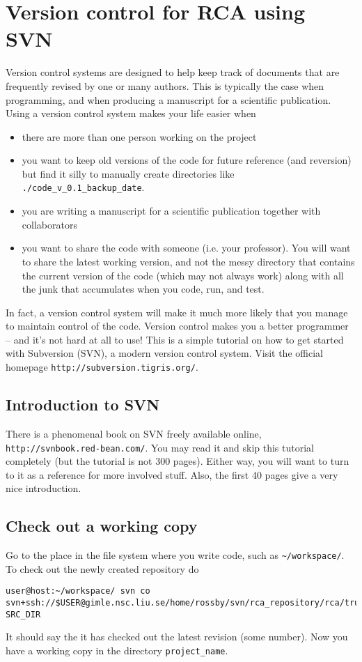 \documentclass{article}
\begin{document}
\section{Version control for RCA using SVN}
Version control systems are designed to help keep track of documents
that are frequently revised by one or many authors. This is typically
the case when programming, and when producing a manuscript for a
scientific publication. Using a version control system makes your life
easier when 
\begin{itemize}
\item there are more than one person working on the project
\item you want to keep old versions of the code for future reference
  (and reversion) but find it silly to manually create directories
  like \verb+./code_v_0.1_backup_date+. 
\item you are writing a manuscript for a scientific publication
  together with collaborators 
\item you want to share the code with someone (i.e. your
  professor). You will want to share the latest working version, and
  not the messy directory that contains the current version of the
  code (which may not always work) along with all the junk that
  accumulates when you code, run, and test.  
\end{itemize}
In fact, a version control system will make it much more likely that
you manage to maintain control of the code. Version control makes you
a better programmer -- and it's not hard at all to use! This is a
simple tutorial on how to get started with Subversion (SVN), a modern
version control system. Visit the official homepage
\verb+http://subversion.tigris.org/+.
\subsection{Introduction to SVN}
There is a phenomenal book on SVN freely available online,
\verb+http://svnbook.red-bean.com/+. You
may read it and skip this tutorial completely (but the tutorial is not
300 pages). Either way, you will want to turn to it as a reference for
more involved stuff. Also, the first 40 pages give a very nice
introduction.  
\subsection{Check out a working copy}
Go to the place in the file system where you write code, such as
\verb+~/workspace/+. To check out the newly created repository do  
\begin{verbatim} 
user@host:~/workspace/ svn co svn+ssh://$USER@gimle.nsc.liu.se/home/rossby/svn/rca_repository/rca/trunk SRC_DIR
\end{verbatim}
It should say the it has checked out the latest revision (some
number). Now you have a working copy in the directory
\verb+project_name+. 
\end{document}
